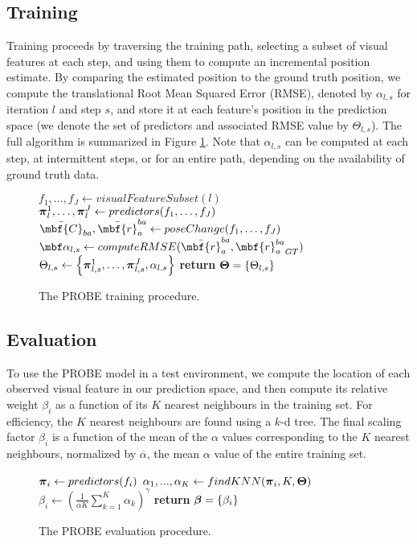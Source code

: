 \subsection{Training}
Training proceeds by traversing the training path, selecting a subset of visual features at each step, and using them to compute an incremental position estimate. By comparing the estimated position to the ground truth position, we compute the translational Root Mean Squared Error (RMSE), denoted by $ \alpha_{l,s} $ for iteration $l$ and step $s$, and store it at each feature's position in the prediction space (we denote the set of predictors and associated RMSE value by $\Theta_{l,s}$). The full algorithm is summarized in Figure \ref{fig:ProbeTraining}. Note that $\alpha_{l,s}$ can be computed at each step, at intermittent steps, or for an entire path, depending on the availability of ground truth data.
\begin{figure}[h]
\begin{algorithmic}[1]
	\State $f_1, \dots, f_J \gets visualFeatureSubset(l)$
	\State $\boldsymbol{\pi}^1_l, \dots, \boldsymbol{\pi}^J_l \gets predictors(f_1, \dots, f_J)$
	\State $\bar{\mbf{C}}_{ba},  \bar{\mbf{r}}_a^{ba} \gets poseChange(f_1, \dots, f_J)$
	\State $\mbf \alpha_{l,s}  \gets computeRMSE(\bar{\mbf{r}}_a^{ba}, {\mbf{r}_{a}^{ba}}_{GT} )$
	\State  $ \Theta_{l,s} \gets \left\{\boldsymbol{\pi}^1_{l,s}, \dots, \boldsymbol{\pi}^J_{l,s}, \alpha_{l,s}\right\}$
\EndFor
\EndFor
\State \textbf{return} $\boldsymbol{\Theta} = \{ \Theta_{l,s} \}$
\EndProcedure
\end{algorithmic}
\caption{The PROBE training procedure.}\label{fig:ProbeTraining}
\end{figure}
	\subsection{Evaluation}
To use the PROBE model in a test environment, we compute the location of each observed visual feature in our prediction space, and then compute its relative weight $\beta_i$ as a function of its $K$ nearest neighbours in the training set.
For efficiency, the $K$ nearest neighbours are found using a $k$-d tree.
The final scaling factor $\beta_i$ is a function of the mean of the $\alpha$ values corresponding to the $K$ nearest neighbours, normalized by $\overline \alpha$, the mean $\alpha$ value of the entire training set.

\begin{figure}[h]
\begin{algorithmic}[1]
	\State $\boldsymbol{\pi}_i  \gets predictors(f_i) $
	\State $\alpha_1,...,\alpha_K \gets findKNN(\boldsymbol{\pi}_i, K, \boldsymbol{\Theta})$
	\State $\beta_i \gets \left(\frac{1}{\overline{\alpha} K} \sum_{k=1}^K \alpha_k  \right)^{\gamma}$
\EndFor
\State \textbf{return}  $\boldsymbol{\beta} = \{\beta_i\}$
\EndProcedure
\end{algorithmic}
\caption{The PROBE evaluation procedure.}\label{fig:ProbeTest}
\end{figure}


